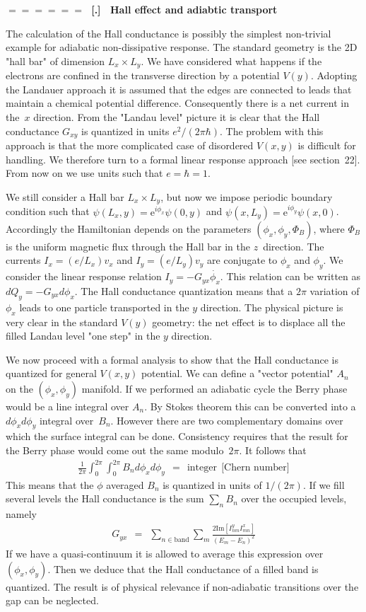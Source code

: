 \documentclass[onecolumn,fleqn]{revtex4}
\newcommand{\im}{\mathrm{Im}}
\newcommand{\eexp}{\mathrm{e}^}
\newcommand{\beq}{\begin{eqnarray}}
\newcommand{\eeq}{\end{eqnarray}}
\renewcommand{\thesubsection}{\arabic{subsection}}
\renewcommand{\thesubsubsection}{\arabic{subsubsection}}
\newcommand{\sheadC}[1]
{
\addtocounter{subsubsection}{1}
\vspace{5mm}
{\Large\bf $=\!=\!=\!=\!=\!=\;$ [\thesubsection.\thesubsubsection] \ #1}  
\nopagebreak
\phantomsection
}
\begin{document}
\sheadC{Hall effect and adiabtic transport}

The calculation of the Hall conductance is possibly the simplest 
non-trivial example for adiabatic non-dissipative response. 
The standard geometry is the 2D "hall bar" of dimension ${L_x\times L_y}$. 
We have considered what happens if the electrons are confined in 
the transverse direction by a potential $V(y)$. 
Adopting the Landauer approach it is assumed that the edges are 
connected to leads that maintain a chemical 
potential difference. Consequently there is a net current in the~$x$
direction. From the "Landau level" picture it is clear that the 
Hall conductance $G_{xy}$ is quantized in units $e^2/(2\pi\hbar)$.
The problem with this approach is that the more complicated
case of disordered $V(x,y)$ is difficult for handling. We therefore 
turn to a formal linear response approach [see section~22]. 
From now on we use  units such that ${e=\hbar=1}$.

We still consider a Hall bar ${L_x\times L_y}$, but now 
we impose periodic boundary condition such that ${\psi(L_x,y)= \eexp{i\phi_x}\psi(0,y)}$ 
and ${\psi(x,L_y)= \eexp{i\phi_y}\psi(x,0)}$. 
Accordingly the Hamiltonian depends on the parameters ${(\phi_x,\phi_y,\Phi_B)}$, 
where $\Phi_B$ is the uniform magnetic flux through 
the Hall bar in the $z$~direction. The currents ${I_x=(e/L_x)v_x}$ 
and $I_y=(e/L_y)v_y$ are conjugate to $\phi_x$ and $\phi_y$.
We consider the linear response relation ${I_y=-G_{yx}\dot{\phi_x}}$.
This relation can be written as ${dQ_y=-G_{yx}d\phi_x}$. 
The Hall conductance quantization means that a $2\pi$ variation 
of $\phi_x$ leads to one particle transported in the $y$ direction.
The physical picture is very clear in the standard $V(y)$ geometry: 
the net effect is to displace all the filled Landau level 
"one step" in the $y$ direction.   

We now proceed with a formal analysis to show that the Hall conductance
is quantized for general $V(x,y)$ potential. We can define 
a "vector potential" $A_n$ on the $(\phi_x,\phi_y)$ manifold. 
If we performed an adiabatic cycle the Berry phase would be 
a line integral over $A_n$. By Stokes theorem this can be 
converted into a  $d\phi_x d\phi_y$ integral over~$B_n$.  
However there are two complementary domains over which the 
surface integral can be done. Consistency requires that the 
result for the Berry phase would come out the same modulo~$2\pi$.
It follows that 
\beq
\frac{1}{2\pi}\int_0^{2\pi}\int_0^{2\pi} B_n d\phi_x d\phi_y 
\ \ = \ \ \mbox{integer} \ \ \mbox{[Chern number]} 
\eeq
This means that the $\phi$ averaged $B_n$ is quantized in units 
of $1/(2\pi)$. If we fill several levels the Hall conductance 
is the sum ${\sum_n B_n}$ over the occupied levels, namely
\beq
G_{yx} \ \ = \ \ \sum_{n \in \mbox{band}}\sum_m 
\frac{2\im[I^y_{nm}I^x_{mn}]}{(E_m-E_n)^2}
\eeq
If we have a quasi-continuum it is allowed to 
average this expression over $(\phi_x,\phi_y)$.
Then we deduce that the Hall conductance of 
a filled band is quantized. The result is of physical 
relevance if non-adiabatic transitions 
over the gap can be neglected.   
\end{document}
